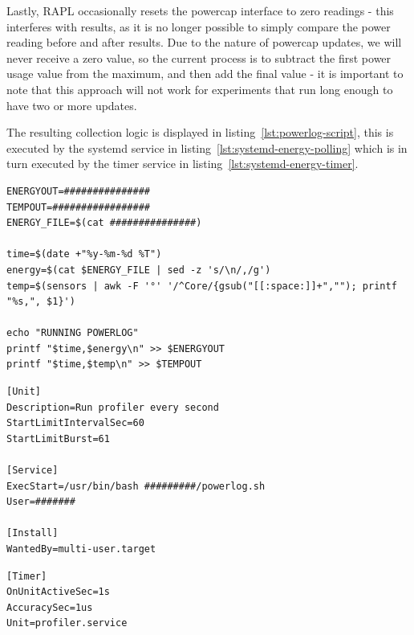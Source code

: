 Lastly, RAPL occasionally resets the powercap interface to zero readings - this interferes with results, as it is no
longer possible to simply compare the power reading before and after results.
Due to the nature of powercap updates, we will never receive a zero value, so the current process is to subtract the
first power usage value from the maximum, and then add the final value - it is important to note that this approach will
not work for experiments that run long enough to have two or more updates.

The resulting collection logic is displayed in listing~\ref{lst:powerlog-script}, this is executed by the systemd service
in listing~\ref{lst:systemd-energy-polling} which is in turn executed by the timer service in listing~\ref{lst:systemd-energy-timer}.

\begin{lstlisting}[caption={power and temperature logging script - variable names have been replaced with hash characters},captionpos=b,label={lst:powerlog-script}]
ENERGYOUT=###############
TEMPOUT=#################
ENERGY_FILE=$(cat ###############)

time=$(date +"%y-%m-%d %T")
energy=$(cat $ENERGY_FILE | sed -z 's/\n/,/g')
temp=$(sensors | awk -F '°' '/^Core/{gsub("[[:space:]]+",""); printf "%s,", $1}')

echo "RUNNING POWERLOG"
printf "$time,$energy\n" >> $ENERGYOUT
printf "$time,$temp\n" >> $TEMPOUT
\end{lstlisting}

\begin{lstlisting}[caption={systemd service},captionpos=b,label={lst:systemd-energy-polling}]
[Unit]
Description=Run profiler every second
StartLimitIntervalSec=60
StartLimitBurst=61

[Service]
ExecStart=/usr/bin/bash #########/powerlog.sh
User=#######

[Install]
WantedBy=multi-user.target
\end{lstlisting}
\begin{lstlisting}[caption={systemd timer},captionpos=b,label={lst:systemd-energy-timer}]
[Timer]
OnUnitActiveSec=1s
AccuracySec=1us
Unit=profiler.service
\end{lstlisting}


